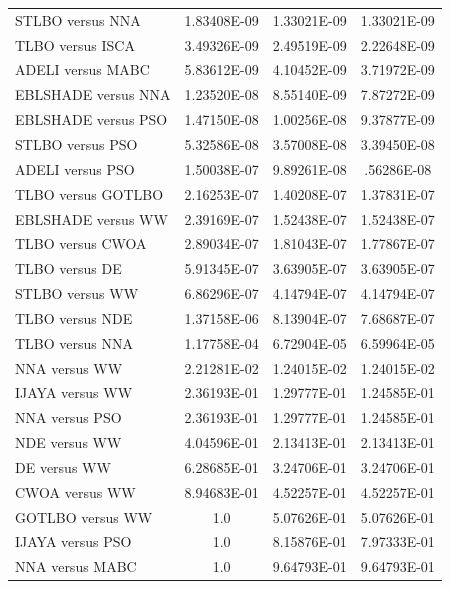 \documentclass[a4paper,fleqn]{cas-dc}
\begin{document}
\begin{table}[<options>]
\begin{tabular*}{\tblwidth}{@{}LCCC@{}}
STLBO versus NNA&1.83408E-09&1.33021E-09&1.33021E-09\\
TLBO versus ISCA&3.49326E-09&2.49519E-09&2.22648E-09\\
ADELI versus MABC&5.83612E-09&4.10452E-09&3.71972E-09\\
EBLSHADE versus NNA&1.23520E-08&8.55140E-09&7.87272E-09\\
EBLSHADE versus PSO&1.47150E-08&1.00256E-08&9.37877E-09\\
STLBO versus PSO&5.32586E-08&3.57008E-08&3.39450E-08\\
ADELI versus PSO&1.50038E-07&9.89261E-08&.56286E-08\\
TLBO versus GOTLBO&2.16253E-07&1.40208E-07&1.37831E-07\\
EBLSHADE versus WW&2.39169E-07&1.52438E-07&1.52438E-07\\
TLBO versus CWOA&2.89034E-07&1.81043E-07&1.77867E-07\\
TLBO versus DE&5.91345E-07&3.63905E-07&3.63905E-07\\
STLBO versus WW&6.86296E-07&4.14794E-07&4.14794E-07\\
TLBO versus NDE&1.37158E-06&8.13904E-07&7.68687E-07\\
TLBO versus NNA&1.17758E-04&6.72904E-05&6.59964E-05\\
NNA versus WW&2.21281E-02&1.24015E-02&1.24015E-02\\
IJAYA versus WW&2.36193E-01&1.29777E-01&1.24585E-01\\
NNA versus PSO&2.36193E-01&1.29777E-01&1.24585E-01\\
NDE versus WW&4.04596E-01&2.13413E-01&2.13413E-01\\
DE versus WW&6.28685E-01&3.24706E-01&3.24706E-01\\
CWOA versus WW&8.94683E-01&4.52257E-01&4.52257E-01\\
GOTLBO versus WW&1.0&5.07626E-01&5.07626E-01\\
IJAYA versus PSO&1.0&8.15876E-01&7.97333E-01\\
NNA versus MABC&1.0&9.64793E-01&9.64793E-01\\
\bottomrule
\end{tabular*}
\end{table}
\end{document}
